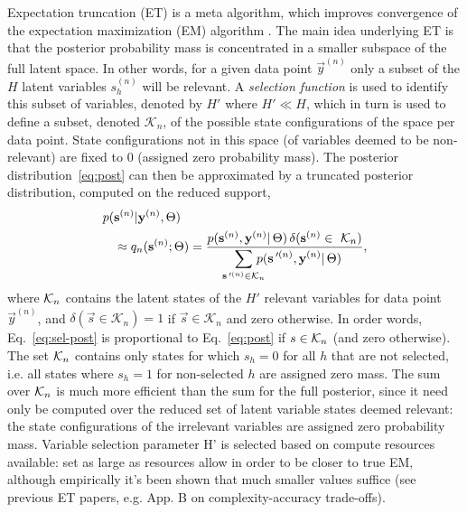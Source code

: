 %
Expectation truncation (ET) is a meta algorithm, which improves convergence of the expectation maximization (EM) algorithm \citep{LuckeEggert2010}.
%
The main idea underlying ET is that the posterior probability mass is concentrated in a smaller subspace of the full latent space.
In other words, for a given data point $\vec{y}^{(n)}$ 
only a subset of the $H$ latent variables $s_h^{(n)}$ will be relevant.
A \textit{selection function} is used to identify this subset
of variables, denoted by $H'$ where $H' \ll H$, which in turn is used to define a subset, denoted $\mathcal{K}_n$, of the possible state configurations of the space per data point. 
State configurations not in this space (of variables deemed to be non-relevant) are fixed to $0$ (assigned zero probability mass).
%
The posterior distribution~\eqref{eq:post} can then be approximated by a truncated posterior distribution, computed on the reduced support,
%
\vspace{-.1cm}
\begin{align}
\label{eq:sel-post}
p(&\vec{s}^{(n)}|\vec{y}^{(n)},\Theta) \nonumber\\
&\approx q_n(\vec{s}^{(n)};\Theta) = \frac{p(\vec{s}^{(n)},\vec{y}^{(n)}|\,\Theta) \,\delta(\vec{s}^{(n)}\in\,\,\Kn)}
{\disS\hspace{-1.5mm}\sum_{\vec{s}\Prime^{(n)}\in\mathcal{K}_n}\hspace{-3mm} p(\vec{s}\Prime^{(n)},\vec{y}^{(n)}|\,\Theta)},
\end{align}
\normalsize
%
where $\mathcal{K}_{n}$ contains the latent states of the $H'$ relevant variables for data point
$\vec{y}^{(n)}$, and $\delta(\vec{s}\in\mathcal{K}_n)=1$ if
$\vec{s}\in\mathcal{K}_n$ and zero otherwise.
In order words, Eq.~\eqref{eq:sel-post} is proportional to Eq.~\eqref{eq:post} if $s \in \mathcal{K}_{n}$ (and zero otherwise). 
The set $\mathcal{K}_{n}$ contains only states for which $s_h=0$ for all $h$ that are not selected, i.e. all states where $s_h=1$ for non-selected $h$ are assigned zero mass.
The sum over $\mathcal{K}_{n}$ is much more efficient than the sum for the full posterior, since it need only be computed over the reduced set of latent variable states deemed relevant: the state configurations of the irrelevant variables are assigned zero probability mass.
Variable selection parameter H' is selected based on compute resources available: set as large as resources allow in order to be closer to true EM, although empirically it's been shown that much smaller values suffice (see previous ET papers, e.g. \citep{SheikhEtAl2014} App. B on complexity-accuracy trade-offs).

